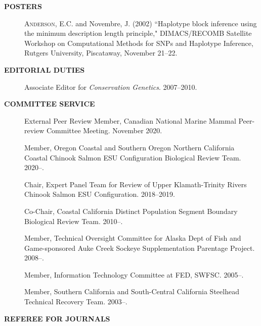 \documentclass[11pt]{article}
\newlength{\postskip}
\newlength{\preskip}
\begin{document}
{\bf POSTERS}
\begin{description}
\item[] \textsc{Anderson, E.C.} and Novembre, J. (2002) ``Haplotype block inference using the minimum
description length principle," DIMACS/RECOMB Satellite Workshop on Computational Methods for SNPs and 
Haplotype Inference, Rutgers University, Piscataway, November 21--22.
\end{description}



\vspace*{\postskip}

{\bf EDITORIAL DUTIES}
\vspace*{\preskip}
\begin{description}
\item[] Associate Editor for {\em Conservation Genetics}. 2007--2010.
\end{description}
\vspace*{\postskip}


{\bf COMMITTEE SERVICE}
\begin{description}
\item[] External Peer Review Member, Canadian National Marine Mammal Peer-review Committee Meeting. November 2020.
\item[] Member, Oregon Coastal and Southern Oregon Northern California Coastal Chinook Salmon ESU Configuration Biological Review Team. 2020--.
\item[] Chair, Expert Panel Team for Review of Upper Klamath-Trinity Rivers Chinook Salmon ESU Configuration. 2018--2019.
\item[] Co-Chair, Coastal California Distinct Population Segment Boundary Biological Review Team. 2010--.
\item[] Member, Technical Oversight Committee for Alaska Dept of Fish and Game-sponsored Auke Creek Sockeye Supplementation Parentage Project. 2008--.
\item[] Member, Information Technology Committee at FED, SWFSC. 2005--.
\item[] Member, Southern California and South-Central California Steelhead Technical Recovery Team. 2003--.
\end{description}
\vspace*{\postskip}

{\bf REFEREE FOR JOURNALS}
\vspace*{\preskip}
\end{document}
